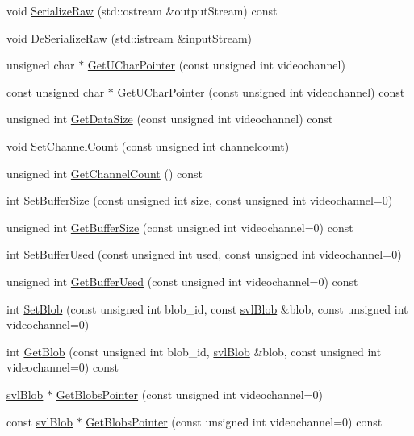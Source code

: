 \begin{DoxyCompactItemize}
\item 
void \hyperlink{classsvl_sample_blobs_a4b527d3e86a9f9149da57f273ba713b1}{Serialize\+Raw} (std\+::ostream \&output\+Stream) const 
\item 
void \hyperlink{classsvl_sample_blobs_a962040ab219b9f0beeef492c2f74e855}{De\+Serialize\+Raw} (std\+::istream \&input\+Stream)
\item 
unsigned char $\ast$ \hyperlink{classsvl_sample_blobs_aae1ebb706b941f782710a19b73fc9615}{Get\+U\+Char\+Pointer} (const unsigned int videochannel)
\item 
const unsigned char $\ast$ \hyperlink{classsvl_sample_blobs_a0a0a842bc90e3d591dbafdf0a1a58c36}{Get\+U\+Char\+Pointer} (const unsigned int videochannel) const 
\item 
unsigned int \hyperlink{classsvl_sample_blobs_a1f40ae9098c9ae19a9f1dad7c283c2b5}{Get\+Data\+Size} (const unsigned int videochannel) const 
\item 
void \hyperlink{classsvl_sample_blobs_ac0029f7fdf03ad4559f1abb132d4ac9d}{Set\+Channel\+Count} (const unsigned int channelcount)
\item 
unsigned int \hyperlink{classsvl_sample_blobs_a3de2572eec6b5e2bdae9d4472b265ef9}{Get\+Channel\+Count} () const 
\item 
int \hyperlink{classsvl_sample_blobs_aa97375adff6bc34248b6a69fc3a79c8b}{Set\+Buffer\+Size} (const unsigned int size, const unsigned int videochannel=0)
\item 
unsigned int \hyperlink{classsvl_sample_blobs_a9af79089dbc65741d44be58fb0767df6}{Get\+Buffer\+Size} (const unsigned int videochannel=0) const 
\item 
int \hyperlink{classsvl_sample_blobs_a2008932bc13d6702dfd9e89bcc56eecb}{Set\+Buffer\+Used} (const unsigned int used, const unsigned int videochannel=0)
\item 
unsigned int \hyperlink{classsvl_sample_blobs_a3a82b0b8e79de2aee85c2d33a3aeb1d4}{Get\+Buffer\+Used} (const unsigned int videochannel=0) const 
\item 
int \hyperlink{classsvl_sample_blobs_a5f701c31afc7843480dc6ebd34e78283}{Set\+Blob} (const unsigned int blob\+\_\+id, const \hyperlink{structsvl_blob}{svl\+Blob} \&blob, const unsigned int videochannel=0)
\item 
int \hyperlink{classsvl_sample_blobs_a19fcfcd2b05d778a2b9d73847bb831b5}{Get\+Blob} (const unsigned int blob\+\_\+id, \hyperlink{structsvl_blob}{svl\+Blob} \&blob, const unsigned int videochannel=0) const 
\item 
\hyperlink{structsvl_blob}{svl\+Blob} $\ast$ \hyperlink{classsvl_sample_blobs_a78846046a65f0efa3deb0a42b44fb00b}{Get\+Blobs\+Pointer} (const unsigned int videochannel=0)
\item 
const \hyperlink{structsvl_blob}{svl\+Blob} $\ast$ \hyperlink{classsvl_sample_blobs_af3c473d242afbeda324314e54d003ec1}{Get\+Blobs\+Pointer} (const unsigned int videochannel=0) const 
\end{DoxyCompactItemize}
